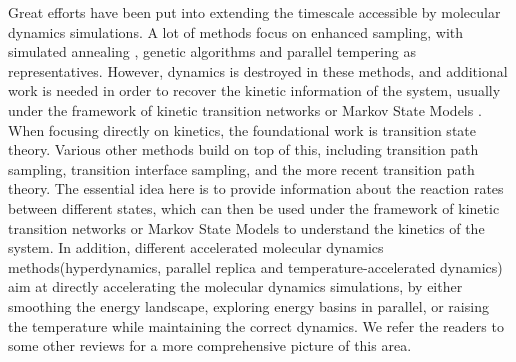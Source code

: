 \documentclass[english, aip, jcp, priprint, graphicx]{revtex4-1}
\theoremstyle{plain}
\theoremstyle{definition}
\theoremstyle{plain}
\begin{document}
Great efforts have been put into extending the timescale accessible by molecular dynamics simulations. A lot of methods focus on enhanced sampling, with simulated annealing \cite{Kirkpatrick1983-su}, genetic algorithms\cite{Goldberg1989-ko} and parallel tempering\cite{Sugita1999-vh} as representatives. However, dynamics is destroyed in these methods, and additional work\cite{Yang2007-gn, Andrec2005-fh, Zheng2009-ow, Huang2010-uu} is needed in order to recover the kinetic information of the system, usually under the framework of kinetic transition networks\cite{Noe2006-cs, Wales2006-ur} or Markov State Models \cite{Pande2010-yi, Chodera2014-bh, Husic2018-xp}. When focusing directly on kinetics, the foundational work is transition state theory\cite{Eyring1935-ur, Chandler1978-bq, Wigner1997-kk}. Various other methods build on top of this, including  transition path sampling\cite{Dellago1998-lb, Bolhuis2002-ws}, transition interface sampling\cite{Van_Erp2005-vw}, and the more recent transition path theory\cite{E2006-fm, E2010-sr}. The essential idea here is to provide information about the reaction rates between different states, which can then be used under the framework of kinetic transition networks\cite{Noe2006-cs, Wales2006-ur} or Markov State Models \cite{Pande2010-yi, Chodera2014-bh, Husic2018-xp} to understand the kinetics of the system. In addition, different accelerated molecular dynamics methods\cite{Perez2009-jy}(hyperdynamics\cite{Voter1997-gi}, parallel replica\cite{Voter1998-mv} and temperature-accelerated dynamics\cite{Sorensen2000-qm}) aim at directly accelerating the molecular dynamics simulations, by either smoothing the energy landscape, exploring energy basins in parallel, or raising the temperature while maintaining the correct dynamics. We refer the readers to some other reviews\cite{Klenin2011-jf, Christen2008-ge, Perez2009-jy} for a more comprehensive picture of this area.
\end{document}
